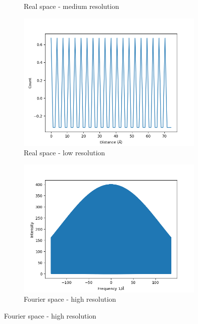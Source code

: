 \documentclass{article}
\begin{document}
\begin{figure}
\begin{subfigure}{0.33\textwidth}
                \caption{Real space - medium resolution}\label{fig:real_delta_1d_medres}
        \end{subfigure}
	\begin{subfigure}{0.33\textwidth}
                \centering
                \includegraphics[width=\textwidth]{real_delta_1d_lowres.png}
                \caption{Real space - low resolution}\label{fig:real_delta_1d_lowres}
	\end{subfigure}
        \begin{subfigure}{0.33\textwidth}
                \centering
                \includegraphics[width=\textwidth]{fourier_delta_1d_highres.png}
                \caption{Fourier space - high resolution}\label{fourier_delta_1d_highres}

\end{subfigure}
\end{figure}
\end{document}
